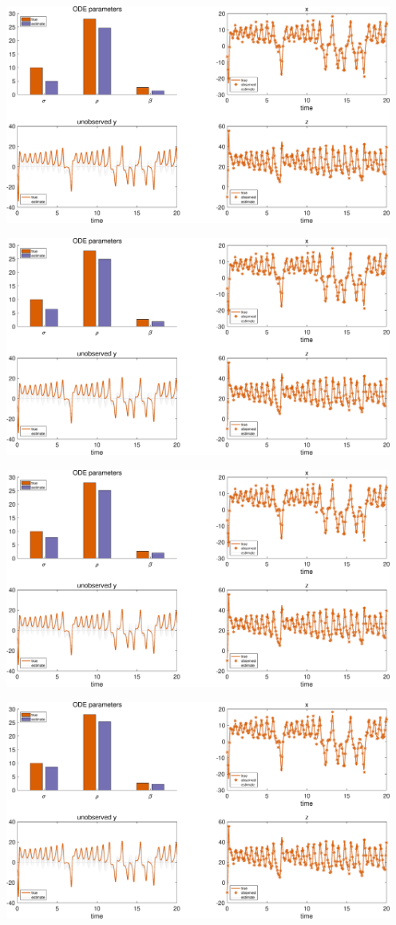 {\includegraphics [width=5in]{Lorenz_attractor_4_08.eps}

\includegraphics [width=5in]{Lorenz_attractor_4_09.eps}

\includegraphics [width=5in]{Lorenz_attractor_4_10.eps}

\includegraphics [width=5in]{Lorenz_attractor_4_11.eps}

}
